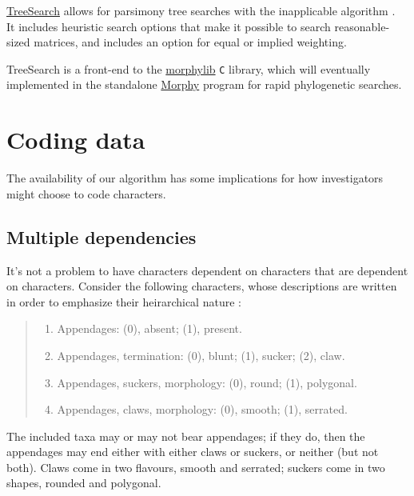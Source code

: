 \documentclass[]{book}
\theoremstyle{definition}
\theoremstyle{definition}
\theoremstyle{definition}
\theoremstyle{remark}
\begin{document}
\href{https://github.com/ms609/TreeSearch}{TreeSearch} allows for
parsimony tree searches with the inapplicable algorithm
\citep{Brazeau2018}.\\
It includes heuristic search options that make it possible to search
reasonable-sized matrices, and includes an option for equal or implied
weighting.

TreeSearch is a front-end to the
\href{https://github.com/mbrazeau/morphylib}{morphylib} \texttt{C}
library, which will eventually implemented in the standalone
\href{http://www.morphyproject.org/}{Morphy} program for rapid
phylogenetic searches.

\hypertarget{coding}{%
\chapter{Coding data}\label{coding}}

The availability of our algorithm has some implications for how
investigators might choose to code characters.

\hypertarget{multiple-dependencies}{%
\section{Multiple dependencies}\label{multiple-dependencies}}

It's not a problem to have characters dependent on characters that are
dependent on characters. Consider the following characters, whose
descriptions are written in order to emphasize their heirarchical nature
\citep[following the recommendations of][]{Sereno2007}:

\begin{quote}
\begin{enumerate}
\def\labelenumi{\arabic{enumi}.}
\item
  Appendages: (0), absent; (1), present.
\item
  Appendages, termination: (0), blunt; (1), sucker; (2), claw.
\item
  Appendages, suckers, morphology: (0), round; (1), polygonal.
\item
  Appendages, claws, morphology: (0), smooth; (1), serrated.
\end{enumerate}
\end{quote}

The included taxa may or may not bear appendages; if they do, then the
appendages may end either with either claws or suckers, or neither (but
not both). Claws come in two flavours, smooth and serrated; suckers come
in two shapes, rounded and polygonal.
\end{document}
